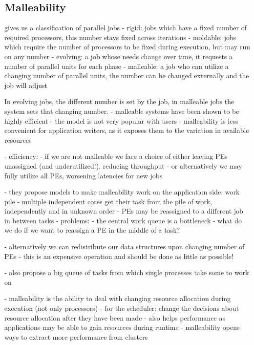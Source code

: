\subsection{Malleability}
\label{prelim: malleability}

\cite{feitelson1997job} gives us a classification of parallel jobs
- rigid: jobs which have a fixed number of required processors, this number stays fixed across iterations
- moldable: jobs which require the number of processors to be fixed during execution, but may run on any number
- evolving: a job whose needs change over time, it requests a number of parallel units for each phase
- malleable: a job who can utilize a changing number of parallel units, the number can be changed externally and the job will adjust

In evolving jobs, the different number is set by the job, in malleable jobs the system sets that changing number.
- malleable systems have been shown to be highly efficient
- the model is not very popular with users
- malleability is less convenient for application writers, as it exposes them to the variation in available resources

- efficiency:
	- if we are not malleable we face a choice of either leaving PEs unassigned (and underutilized!), reducing throughput
	- or alternatively we may fully utilize all PEs, worsening latencies for new jobs
	
- they propose models to make malleability work on the application side: work pile
	- multiple independent cores get their task from the pile of work, independently and in unknown order
	- PEs may be reassigned to a different job in between tasks
- problems:
	- the central work queue is a bottleneck
	- what do we do if we want to reassign a PE in the middle of a task?
	
- alternatively we can redistribute our data structures upon changing number of PEs
- this is an expensive operation and should be done as little as possible!

\cite{tucker1989process}
- also propose a big queue of tasks from which single processes take some to work on

\cite{sonmez2007scheduling}
- malleability is the ability to deal with changing resource allocation during execution (not only processors)
- for the scheduler: change the decisions about resource allocation after they have been made
- also helps performance as applications may be able to gain resources during runtime
- malleability opens ways to extract more performance from clusters

